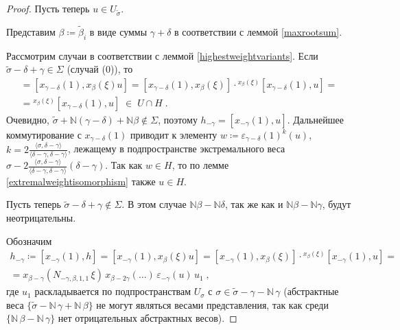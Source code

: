 \documentclass[10pt]{article}
\theoremstyle{break}
\theoremstyle{remark}
\newcommand{\N}{\mathbb{N}}
\begin{document}
\begin{proof}
Пусть теперь $u \in  U_{\widetilde\sigma}$. 

Представим $\beta\coloneqq\widetilde\beta_i$ в виде суммы $\gamma+\delta$ в соответствии с леммой \ref{maxrootsum}.

Рассмотрим случаи в соответствии с леммой \ref{highestweightvariants}.
Если $\widetilde\sigma-\delta+\gamma \in \Sigma$ (случай (0)), то
\begin{multline*}
[x_{\gamma-\delta}(1),h] = [x_{\gamma-\delta}(1),x_\beta(\xi)u] = [x_{\gamma-\delta}(1),x_\beta(\xi)] \cdot {}^{x_\beta(\xi)}[x_{\gamma-\delta}(1),u] =\\=
{}^{x_\beta(\xi)}[x_{\gamma-\delta}(1),u] \;\in\; U\cap H \;.
\end{multline*}
Очевидно, $\widetilde\sigma + \N(\gamma-\delta)+\N\beta \notin \Sigma$, поэтому
$h_{-\gamma} = [x_{-\gamma}(1),u]$. Дальнейшее коммутирование с $x_{\gamma-\delta}(1)$ приводит к элементу $w\coloneqq\varepsilon_{\gamma-\delta}(1)^k(u)$, $k=2\frac{\langle\sigma,\delta-\gamma\rangle}{\langle\delta-\gamma,\delta-\gamma\rangle}$, лежащему в подпространстве экстремального веса $\sigma-2\frac{\langle\sigma,\delta-\gamma\rangle}{\langle\delta-\gamma,\delta-\gamma\rangle}(\delta-\gamma)$. Так как $w\in H$, то по лемме \ref{extremalweightisomorphism} также $u \in H$.

Пусть теперь $\widetilde\sigma-\delta+\gamma \notin \Sigma$. В этом случае $\N\beta-\N\delta$, так же как и $\N\beta-\N\gamma$, будут неотрицательны.

Обозначим
\begin{multline*}
h_{-\gamma} \coloneqq [x_{-\gamma}(1),h] = [x_{-\gamma}(1),x_\beta(\xi) u] = [x_{-\gamma}(1),x_\beta(\xi)] \cdot {}^{x_\beta(\xi)}[x_{-\gamma}(1),u] = \\ =
x_{\beta-\gamma}(N_{-\gamma,\beta,1,1} \,\xi) \, x_{\beta-2\gamma}(\ldots) \, \varepsilon_{-\gamma}(u) \, u_1 \; ,
\end{multline*}
где $u_1$ раскладывается по подпространствам $U_\sigma$ с $\sigma \in \widetilde\sigma-\gamma - \N \, \gamma$ (абстрактные веса $\{\widetilde\sigma-\N\,\gamma+\N\,\beta\}$ не могут являться весами представления, так как среди $\{\N\,\beta-\N\,\gamma\}$ нет отрицательных абстрактных весов).


\end{proof}
\end{document}
